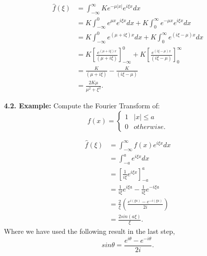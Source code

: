\documentclass[11pt]{article}
\begin{document}
\begin{align*}
    \hat{f}(\xi) &= \int_{-\infty}^{\infty} K e^{-\mu |x|} e^{i \xi x} dx \\
    &= K \int_{-\infty}^{0} e^{\mu x} e^{i \xi x} dx + K \int_{0}^{\infty} e^{-\mu x} e^{i \xi x} dx \\
    &= K \int_{-\infty}^{0} e^{(\mu + i\xi) x} dx + K \int_{0}^{\infty} e^{(i\xi - \mu) x} dx \\
    &= K \left[ \frac{e^{(\mu + i\xi) x}}{(\mu + i\xi)} \right]_{-\infty}^{0} + K \left[ \frac{e^{(i\xi - \mu) x}}{(i\xi - \mu)} \right]_{0}^{\infty} \\
    &= \frac{K}{(\mu + i\xi)} - \frac{K}{(i\xi - \mu)} \\
    &= \frac{2K\mu}{\mu^2 + \xi^2}.
\end{align*}

\textbf{4.2. Example:} Compute the Fourier Transform of:
\begin{equation*}
f(x) = 
\begin{cases} 
      1 & |x|\leq a \\
      0 & otherwise.
   \end{cases}
\end{equation*}

\begin{align*}
    \hat{f}(\xi) &= \int_{-\infty}^{\infty} f(x) e^{i \xi x} dx \\
    &= \int_{-a}^{a} e^{i \xi x} dx \\
    &= \left[ \frac{1}{i\xi} e^{i \xi x} \right]_{-a}^{a} \\
    &= \frac{1}{i\xi} e^{i \xi a} - \frac{1}{i\xi} e^{-i \xi a} \\
    &= \frac{2}{\xi} \left( \frac{e^{i (\xi a)} - e^{-i (\xi a)}}{2i} \right) \\
    &= \frac{2sin(a\xi)}{\xi}.
\end{align*}
Where we have used the following result in the last step,
\begin{equation*}
    sin\theta = \frac{e^{i\theta} - e^{-i\theta}}{2i}.
\end{equation*}
\end{document}
